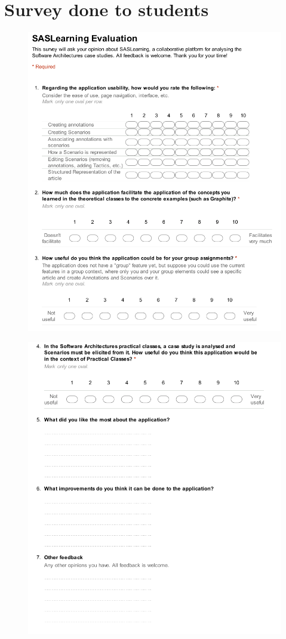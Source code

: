 
\chapter{Survey done to students}
\label{appendix:appendix_a}
\begin{figure}[h]
\centering
\includegraphics[scale=0.6]{images/survey3}
\end{figure}

\begin{figure}
\centering
\includegraphics[scale=0.6]{images/survey4}
\end{figure}
